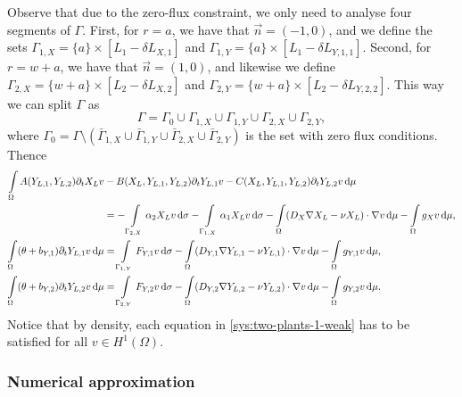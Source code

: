 \documentclass[11pt]{article}
\numberwithin{equation}{section}
\begin{document}
Observe that due to the zero-flux constraint, we only need to analyse four segments of $\Gamma$. First, for \( r = a\), we have that \(\vec{n} = (-1,0)\), and we define the sets \( \Gamma_{1, X} = \{a\} \times [L_1 - \delta L_{X,1}]\) and 
\( \Gamma_{1, Y} = \{a\} \times [L_1 - \delta L_{Y,1,1}]\). Second, for \(r = w+a\), we have that \(\vec{n} = (1,0)\), and likewise we define \( \Gamma_{2, X} = \{w+a\} \times [L_2 - \delta L_{X,2}]\) and \( \Gamma_{2, Y} = \{w+a\} \times [L_2 - \delta L_{Y,2,2}]\). This way we can split \(\Gamma\) as 
\[ 
    \Gamma = \Gamma_0 \cup \Gamma_{1, X} \cup \Gamma_{1, Y} \cup \Gamma_{2, X} \cup \Gamma_{2,Y},
\]
where \( \Gamma_0 = \Gamma \setminus (\bar{\Gamma}_{1, X} \cup \bar{\Gamma}_{1, Y} \cup \bar{\Gamma}_{2, X} \cup \bar{\Gamma}_{2,Y}) \) is the set with zero flux conditions.
Thence
\begin{subequations}
\label{sys:two-plants-1-weak}
\begin{align}
    \int\limits_\Omega
    A(Y_{L,1}, Y_{L,2}) \partial_t X_L v &- B(X_L, Y_{L,1}, Y_{L,2}) \partial_t Y_{L,1} v - C(X_L, Y_{L,1}, Y_{L,2}) \partial_t Y_{L,2} v \dif \mu 
    \notag
    \\
    &=
    -\int\limits_{\Gamma_{2,X}}  \alpha_2 X_L v \dif \sigma
    - \int\limits_{\Gamma_{1,X}} \alpha_1 X_L v \dif \sigma
    -\int\limits_\Omega
    (D_X \nabla X_L - \nu X_L) \cdot \nabla v  \dif \mu
    -\int\limits_\Omega g_X v \dif \mu,
    \\
    \int\limits_\Omega (\theta + b_{Y,1}) \partial_t Y_{L,1} v \dif \mu  &=
    \int\limits_{\Gamma_{1,Y}} F_{Y,1} v \dif\sigma
    -\int\limits_\Omega (D_{Y,1} \nabla Y_{L,1} - \nu Y_{L,1}) \cdot \nabla v \dif\mu - \int\limits_\Omega g_{Y,1} v \dif\mu,
    \\
    \int\limits_\Omega (\theta + b_{Y,2}) \partial_t Y_{L,2} v \dif\mu  &= \int\limits_{\Gamma_{2,Y}} F_{Y,2} v \dif\sigma - 
    \int\limits_\Omega (D_{Y,2} \nabla Y_{L,2} - \nu Y_{L,2}) \cdot \nabla v \dif\mu - \int\limits_\Omega g_{Y,2} v \dif\mu.
\end{align}
\end{subequations}
Notice that by density, each equation in \eqref{sys:two-plants-1-weak} has to be satisfied for all \(v\in H^1(\Omega)\).


\subsubsection{Numerical approximation}
\end{document}
